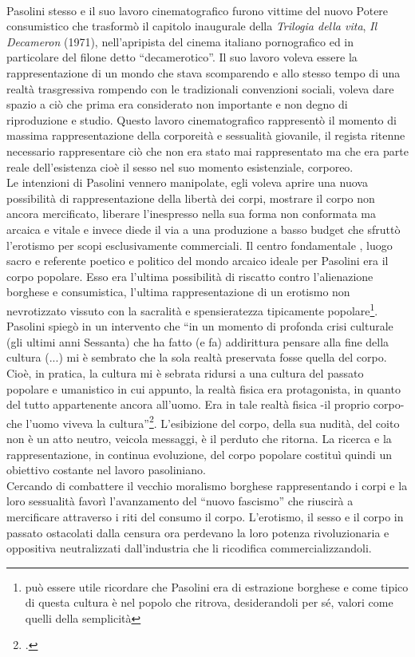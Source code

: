 \paragraph{}Pasolini stesso e il suo lavoro cinematografico furono vittime del nuovo Potere consumistico che trasformò il capitolo inaugurale della \textit{Trilogia della vita}, \textit{Il Decameron} (1971), nell'apripista del cinema italiano pornografico ed in particolare del filone detto \enquote{decamerotico}.
Il suo lavoro voleva essere la rappresentazione di un mondo che stava scomparendo e allo stesso tempo di una realtà trasgressiva rompendo con le tradizionali convenzioni sociali, voleva dare spazio a ciò che prima era considerato non importante e non degno di riproduzione e studio.
Questo lavoro cinematografico rappresentò il momento di massima rappresentazione della corporeità e sessualità giovanile, il regista ritenne necessario rappresentare ciò che non era stato mai rappresentato ma che era parte reale dell'esistenza cioè il sesso nel suo momento esistenziale, corporeo.
\\Le intenzioni di Pasolini vennero manipolate, egli voleva aprire una nuova possibilità di rappresentazione della libertà dei corpi, mostrare il corpo non ancora mercificato, liberare l'inespresso nella sua forma non conformata ma arcaica e vitale e invece diede il via a una produzione a basso budget che sfruttò l'erotismo per scopi esclusivamente commerciali.
Il centro fondamentale , luogo sacro e referente poetico e politico del mondo arcaico ideale per Pasolini era il corpo popolare.
Esso era l'ultima possibilità di riscatto contro l'alienazione borghese e consumistica, l'ultima rappresentazione di un erotismo non nevrotizzato vissuto con la sacralità e spensieratezza tipicamente popolare\footnote{può essere utile ricordare che Pasolini era di estrazione borghese e come tipico di questa cultura è nel popolo che ritrova, desiderandoli per sé, valori come quelli della semplicità}.
Pasolini spiegò in un intervento che \enquote{in un momento di profonda crisi culturale (gli ultimi anni Sessanta) che ha fatto (e fa) addirittura pensare alla fine della cultura (...) mi è sembrato che la sola realtà preservata fosse quella del corpo. Cioè, in pratica, la cultura mi è sebrata ridursi a una cultura del passato popolare e umanistico in cui appunto, la realtà fisica era protagonista, in quanto del tutto appartenente ancora all'uomo. Era in tale realtà fisica -il proprio corpo- che l'uomo viveva la cultura}\footcite{Tetis}.
L'esibizione del corpo, della sua nudità, del coito non è un atto neutro, veicola messaggi, è il perduto che ritorna.
La ricerca e la rappresentazione, in continua evoluzione, del corpo popolare costituì quindi un obiettivo costante nel lavoro pasoliniano.
\\Cercando di combattere il vecchio moralismo borghese rappresentando i corpi e la loro sessualità favorì l'avanzamento del \enquote{nuovo fascismo} che riuscirà a mercificare attraverso i riti del consumo il corpo.
L'erotismo, il sesso e il corpo in passato ostacolati dalla censura ora perdevano la loro potenza rivoluzionaria e oppositiva neutralizzati dall'industria che li ricodifica commercializzandoli.


